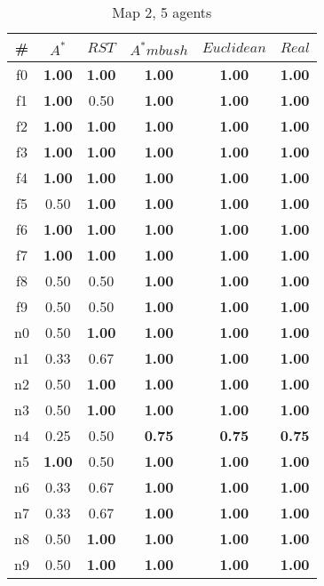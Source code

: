 \begin{table}[h]
\caption{Map 2, 5 agents}
\begin{center}

\begin{tabular}{|c|c|c|c|c|c|}
\hline
\# & $A^*$ & $RST$ & $A^*mbush$ & $Euclidean$ & $Real$\\
\hline
f0 & \textbf{1.00} & \textbf{1.00} & \textbf{1.00} & \textbf{1.00} & \textbf{1.00}\\
f1 & \textbf{1.00} & 0.50 & \textbf{1.00} & \textbf{1.00} & \textbf{1.00}\\
f2 & \textbf{1.00} & \textbf{1.00} & \textbf{1.00} & \textbf{1.00} & \textbf{1.00}\\
f3 & \textbf{1.00} & \textbf{1.00} & \textbf{1.00} & \textbf{1.00} & \textbf{1.00}\\
f4 & \textbf{1.00} & \textbf{1.00} & \textbf{1.00} & \textbf{1.00} & \textbf{1.00}\\
f5 & 0.50 & \textbf{1.00} & \textbf{1.00} & \textbf{1.00} & \textbf{1.00}\\
f6 & \textbf{1.00} & \textbf{1.00} & \textbf{1.00} & \textbf{1.00} & \textbf{1.00}\\
f7 & \textbf{1.00} & \textbf{1.00} & \textbf{1.00} & \textbf{1.00} & \textbf{1.00}\\
f8 & 0.50 & 0.50 & \textbf{1.00} & \textbf{1.00} & \textbf{1.00}\\
f9 & 0.50 & 0.50 & \textbf{1.00} & \textbf{1.00} & \textbf{1.00}\\
\hline
n0 & 0.50 & \textbf{1.00} & \textbf{1.00} & \textbf{1.00} & \textbf{1.00}\\
n1 & 0.33 & 0.67 & \textbf{1.00} & \textbf{1.00} & \textbf{1.00}\\
n2 & 0.50 & \textbf{1.00} & \textbf{1.00} & \textbf{1.00} & \textbf{1.00}\\
n3 & 0.50 & \textbf{1.00} & \textbf{1.00} & \textbf{1.00} & \textbf{1.00}\\
n4 & 0.25 & 0.50 & \textbf{0.75} & \textbf{0.75} & \textbf{0.75}\\
n5 & \textbf{1.00} & 0.50 & \textbf{1.00} & \textbf{1.00} & \textbf{1.00}\\
n6 & 0.33 & 0.67 & \textbf{1.00} & \textbf{1.00} & \textbf{1.00}\\
n7 & 0.33 & 0.67 & \textbf{1.00} & \textbf{1.00} & \textbf{1.00}\\
n8 & 0.50 & \textbf{1.00} & \textbf{1.00} & \textbf{1.00} & \textbf{1.00}\\
n9 & 0.50 & \textbf{1.00} & \textbf{1.00} & \textbf{1.00} & \textbf{1.00}\\
\hline
\end{tabular}

\label{tab:exp4}
\end{center}
\end{table}

